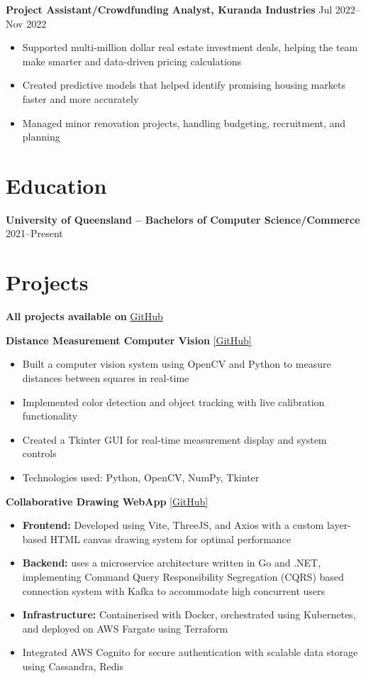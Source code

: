 \documentclass[10pt,a4paper]{article}
\begin{document}
	\textbf{Project Assistant/Crowdfunding Analyst, Kuranda Industries} \hfill Jul 2022--Nov 2022 
	\begin{itemize}[label=\textbullet, itemsep=0.05cm]
		\item Supported multi-million dollar real estate investment deals, helping the team make smarter and data-driven pricing calculations 
		\item Created predictive models that helped identify promising housing markets faster and more accurately
		\item Managed minor renovation projects, handling budgeting, recruitment, and planning
	\end{itemize}
	
	\section{Education}
	\textbf{University of Queensland -- Bachelors of Computer Science/Commerce} \hfill 2021--Present \\	
	\section{Projects}
	\textbf{All projects available on} \href{https://github.com/CameronBadman}{GitHub}
	
	\textbf{Distance Measurement Computer Vision} \href{https://github.com/CameronBadman/computer-vision}{[GitHub]}
	\begin{itemize}[label=\textbullet, itemsep=0.05cm]
		\item Built a computer vision system using OpenCV and Python to measure distances between squares in real-time
		\item Implemented color detection and object tracking with live calibration functionality
		\item Created a Tkinter GUI for real-time measurement display and system controls
		\item Technologies used: Python, OpenCV, NumPy, Tkinter
	\end{itemize}
	
	\textbf{Collaborative Drawing WebApp} \href{https://github.com/CameronBadman/Canvis-collab-webapp}{[GitHub]}
	\begin{itemize}[label=\textbullet, itemsep=0.05cm]
		\item \textbf{Frontend:} Developed using Vite, ThreeJS, and Axios with a custom layer-based HTML canvas drawing system for optimal performance
		\item \textbf{Backend:} uses a microservice architecture written in Go and .NET, implementing Command Query Responsibility Segregation (CQRS) based connection system with Kafka to accommodate high concurrent users
		\item \textbf{Infrastructure:} Containerised with Docker, orchestrated using Kubernetes, and deployed on AWS Fargate using Terraform
		\item Integrated AWS Cognito for secure authentication with scalable data storage using Cassandra, Redis
	\end{itemize}
	
\end{document}
